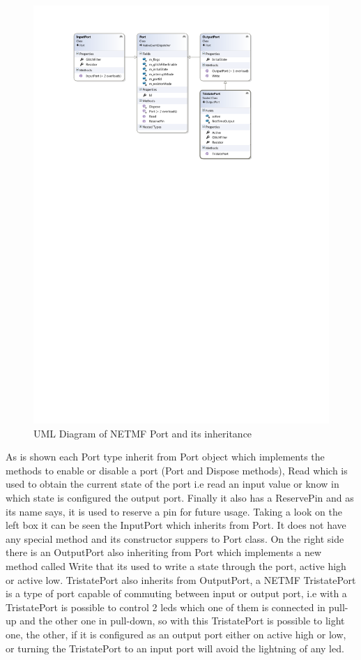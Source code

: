 \begin{figure}[H]\begin{center}
 \centering
  \captionsetup{justification=centering}
  \includegraphics[width=1\textwidth]{pictures/iosharp/gpio}
  \caption{UML Diagram of NETMF Port and its inheritance \label{fig:gpio-uml}}
\end{center}\end{figure}

As is shown each Port type inherit from Port object which implements the methods to enable or disable a port (Port and Dispose methods), Read which is used to obtain the current state of the port i.e read an input value or know in which state is configured the output port. Finally it also has a ReservePin and as its name says, it is used to reserve a pin for future usage. Taking a look on the left box it can be seen the InputPort which inherits from Port. It does not have any special method and its constructor suppers to Port class. On the right side there is an OutputPort also inheriting from Port which implements a new method called Write that its used to write a state through the port, active high or active low. TristatePort also inherits from OutputPort, a NETMF TristatePort is a type of port capable of commuting between input or output port, i.e with a TristatePort is possible to control 2 leds which one of them is connected in pull-up and the other one in pull-down, so with this TristatePort is possible to light one, the other, if it is configured as an output port either on active high or low, or turning the TristatePort to an input port will avoid the lightning of any led.

